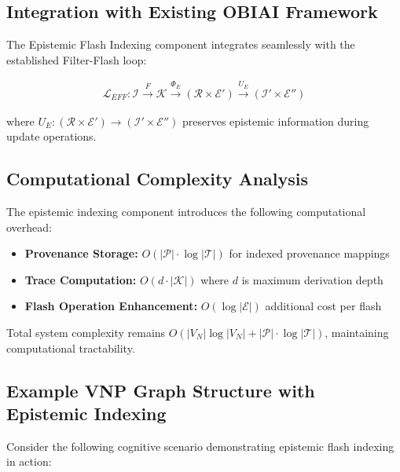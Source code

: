 \documentclass[12pt]{article}
\begin{document}
\subsection{Integration with Existing OBIAI Framework}

The Epistemic Flash Indexing component integrates seamlessly with the established Filter-Flash loop:

\begin{align}
\mathcal{L}_{EFF}: \mathcal{I} \xrightarrow{F} \mathcal{K} \xrightarrow{\Phi_E} (\mathcal{R} \times \mathcal{E}') \xrightarrow{U_E} (\mathcal{I}' \times \mathcal{E}'')
\end{align}

where $U_E: (\mathcal{R} \times \mathcal{E}') \rightarrow (\mathcal{I}' \times \mathcal{E}'')$ preserves epistemic information during update operations.

\subsection{Computational Complexity Analysis}

The epistemic indexing component introduces the following computational overhead:

\begin{itemize}
\item \textbf{Provenance Storage:} $O(|\mathcal{P}| \cdot \log |\mathcal{T}|)$ for indexed provenance mappings
\item \textbf{Trace Computation:} $O(d \cdot |\mathcal{K}|)$ where $d$ is maximum derivation depth
\item \textbf{Flash Operation Enhancement:} $O(\log |\mathcal{E}|)$ additional cost per flash
\end{itemize}

Total system complexity remains $O(|V_N| \log |V_N| + |\mathcal{P}| \cdot \log |\mathcal{T}|)$, maintaining computational tractability.

\subsection{Example VNP Graph Structure with Epistemic Indexing}

Consider the following cognitive scenario demonstrating epistemic flash indexing in action:
\end{document}
